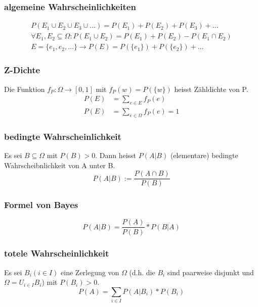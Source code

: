 \documentclass[landscape,twocolumn,a4paper]{article}
\begin{document}
\subsubsection*{algemeine Wahrscheinlichkeiten}
\begin{align*}
	 P(E_1 \cup E_2 \cup E_3 \cup  \dots ) = P(E_1) + P(E_2) + P(E_3) + \dots \\	 
	 \forall E_1, E_2 \subseteq \Omega : P(E_1\cup E_2) = P(E_1) + P(E_2) - P(E_1 \cap E_2)\\
	 E=\{e_1,e_2, \dots \} \rightarrow P(E) = P(\{e_1\}) + P(\{e_2\}) + \dots
\end{align*}

\subsubsection*{Z-Dichte}
Die Funktion $f_P : \Omega \rightarrow [0,1]$ mit $f_P(w)=P(\{w\})$ heisst Zähldichte von P.
\begin{align*}
	 P(E) &=\sum_{e \in E} f_P(e) \\
	 P(E) &=\sum_{e \in \Omega} f_P(e)=1
\end{align*}

\subsubsection*{bedingte Wahrscheinlichkeit}
Es sei $B \subseteq \Omega$ mit $P(B) > 0$. Dann heisst $P(A|B)$ (elementare) bedingte Wahrscheibnlichkeit von A unter B.
\begin{equation*}
	 P(A|B) := \frac{P(A \cap B)}{P(B)}
\end{equation*}

\subsubsection*{Formel von Bayes}
\begin{equation*}
	 P(A|B)=\frac{P(A)}{P(B)} * P(B | A)
\end{equation*}

\subsubsection*{totele Wahrscheinlichkeit}
Es sei  $B_i(i \in I)$ eine Zerlegung von $\Omega$ (d.h. die $B_i$ sind paarweise disjunkt und $\Omega=U_{i \in I} B_i$) mit $P(B_i) > 0$.
\begin{equation*}
	 P(A) = \sum_{i \in I} P(A | B_i) * P(B_i)
\end{equation*}
\end{document}
